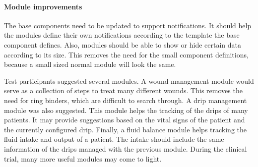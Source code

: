     \paragraph{Module improvements} The base components need to be updated to support notifications. It should help the modules define their own notifications according to the template the base component defines. Also, modules should be able to show or hide certain data according to its size. This removes the need for the small component definitions, because a small sized normal module will look the same.

    Test participants suggested several modules. A wound management module would serve as a collection of steps to treat many different wounds. This removes the need for ring binders, which are difficult to search through. A drip management module was also suggested. This module helps the tracking of the drips of many patients. It may provide suggestions based on the vital signs of the patient and the currently configured drip. Finally, a fluid balance module helps tracking the fluid intake and output of a patient. The intake should include the same information of the drips managed with the previous module. During the clinical trial, many more useful modules may come to light.


